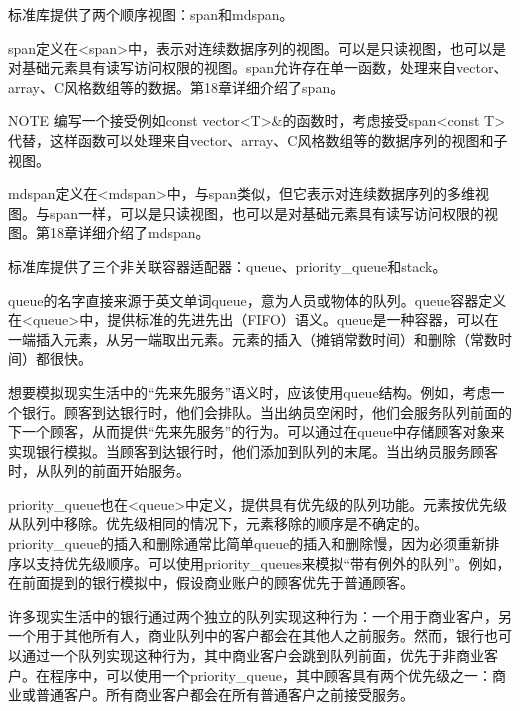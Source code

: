 
标准库提供了两个顺序视图：span和mdspan。


span定义在<span>中，表示对连续数据序列的视图。可以是只读视图，也可以是对基础元素具有读写访问权限的视图。span允许存在单一函数，处理来自vector、array、C风格数组等的数据。第18章详细介绍了span。

\begin{myNotic}{NOTE}
编写一个接受例如const vector<T>\&的函数时，考虑接受span<const T>代替，这样函数可以处理来自vector、array、C风格数组等的数据序列的视图和子视图。
\end{myNotic}



mdspan定义在<mdspan>中，与span类似，但它表示对连续数据序列的多维视图。与span一样，可以是只读视图，也可以是对基础元素具有读写访问权限的视图。第18章详细介绍了mdspan。


标准库提供了三个非关联容器适配器：queue、priority\_queue和stack。


queue的名字直接来源于英文单词queue，意为人员或物体的队列。queue容器定义在<queue>中，提供标准的先进先出（FIFO）语义。queue是一种容器，可以在一端插入元素，从另一端取出元素。元素的插入（摊销常数时间）和删除（常数时间）都很快。

想要模拟现实生活中的“先来先服务”语义时，应该使用queue结构。例如，考虑一个银行。顾客到达银行时，他们会排队。当出纳员空闲时，他们会服务队列前面的下一个顾客，从而提供“先来先服务”的行为。可以通过在queue中存储顾客对象来实现银行模拟。当顾客到达银行时，他们添加到队列的末尾。当出纳员服务顾客时，从队列的前面开始服务。


priority\_queue也在<queue>中定义，提供具有优先级的队列功能。元素按优先级从队列中移除。优先级相同的情况下，元素移除的顺序是不确定的。priority\_queue的插入和删除通常比简单queue的插入和删除慢，因为必须重新排序以支持优先级顺序。可以使用priority\_queues来模拟“带有例外的队列”。例如，在前面提到的银行模拟中，假设商业账户的顾客优先于普通顾客。

许多现实生活中的银行通过两个独立的队列实现这种行为：一个用于商业客户，另一个用于其他所有人，商业队列中的客户都会在其他人之前服务。然而，银行也可以通过一个队列实现这种行为，其中商业客户会跳到队列前面，优先于非商业客户。在程序中，可以使用一个priority\_queue，其中顾客具有两个优先级之一：商业或普通客户。所有商业客户都会在所有普通客户之前接受服务。

